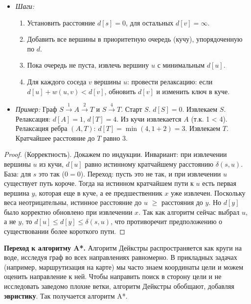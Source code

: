 \documentclass[12pt, a4paper]{article}
\begin{document}
\begin{itemize}
    \item \textit{Шаги:}
    \begin{enumerate}
        \item Установить расстояние $d[s] = 0$, для остальных $d[v] = \infty$.
        \item Добавить все вершины в приоритетную очередь (кучу), упорядоченную по $d$.
        \item Пока очередь не пуста, извлечь вершину $u$ с минимальным $d[u]$.
        \item Для каждого соседа $v$ вершины $u$: провести релаксацию: если $d[u] + w(u, v) < d[v]$, обновить $d[v]$ и изменить ключ в куче.
    \end{enumerate}
    \item \textit{Пример:} Граф $S \xrightarrow{1} A \xrightarrow{2} T$ и $S \xrightarrow{4} T$. Старт $S$. $d[S]=0$. Извлекаем $S$. Релаксация: $d[A]=1$, $d[T]=4$. Из кучи извлекается $A$ (т.к. 1 < 4). Релаксация ребра $(A, T)$: $d[T] = \min(4, 1+2) = 3$. Извлекаем $T$. Кратчайшее расстояние до $T$ равно 3.
\end{itemize}
\begin{proof}
(Корректность). Докажем по индукции. Инвариант: при извлечении вершины $u$ из кучи, $d[u]$ равно истинному кратчайшему расстоянию $\delta(s, u)$. База: для $s$ это так ($0=0$). Переход: пусть это не так, и при извлечении $u$ существует путь короче. Тогда на истинном кратчайшем пути к $u$ есть первая вершина $y$, которая еще в куче, а ее предшественник $x$ уже извлечен. Поскольку веса неотрицательны, истинное расстояние до $u$ $\ge$ расстояния до $y$. Но $d[y]$ было корректно обновлено при извлечении $x$. Так как алгоритм сейчас выбрал $u$, а не $y$, то $d[u] \le d[y] \le \delta(s, u)$, что противоречит предположению о существовании более короткого пути.
\end{proof}

\textbf{Переход к алгоритму A*.}
Алгоритм Дейкстры распространяется как круги на воде, исследуя граф во всех направлениях равномерно. В прикладных задачах (например, маршрутизация на карте) мы часто знаем координаты цели и можем оценить направление к ней. Чтобы направить поиск в сторону цели и не исследовать заведомо плохие ветки, алгоритм Дейкстры обобщают, добавляя \textbf{эвристику}. Так получается алгоритм A*.
\end{document}

